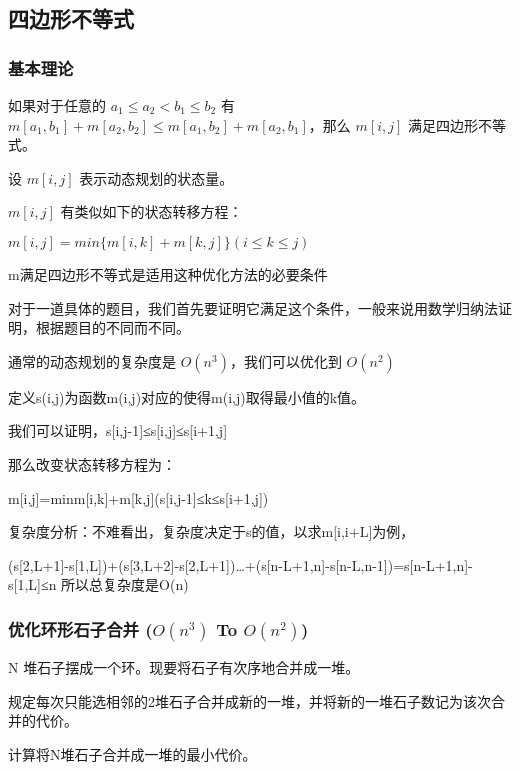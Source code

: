 \subsection{四边形不等式}

\subsubsection{基本理论}

如果对于任意的 $a_1 \le a_2 < b_1 \le b_2 $ 有 $m[a_1, b_1] + m[a_2, b_2] \le m[a_1, b_2] + m[a_2, b_1]$，那么 $m[i, j]$ 满足四边形不等式。

设 $m[i, j]$ 表示动态规划的状态量。

$m[i, j]$ 有类似如下的状态转移方程：

$m[i,j] = min\{m[i, k] + m[k, j]\} (i \le k \le j)$

m满足四边形不等式是适用这种优化方法的必要条件

对于一道具体的题目，我们首先要证明它满足这个条件，一般来说用数学归纳法证明，根据题目的不同而不同。

通常的动态规划的复杂度是 $O(n^3)$，我们可以优化到 $O(n^2)$

定义s(i,j)为函数m(i,j)对应的使得m(i,j)取得最小值的k值。

我们可以证明，s[i,j-1]≤s[i,j]≤s[i+1,j]

那么改变状态转移方程为：

m[i,j]=min{m[i,k]+m[k,j]}(s[i,j-1]≤k≤s[i+1,j])

复杂度分析：不难看出，复杂度决定于s的值，以求m[i,i+L]为例，

(s[2,L+1]-s[1,L])+(s[3,L+2]-s[2,L+1])…+(s[n-L+1,n]-s[n-L,n-1])=s[n-L+1,n]-s[1,L]≤n
所以总复杂度是O(n)

\subsubsection{优化环形石子合并  ($O(n^3)$ To $O(n^2)$)}

N 堆石子摆成一个环。现要将石子有次序地合并成一堆。

规定每次只能选相邻的2堆石子合并成新的一堆，并将新的一堆石子数记为该次合并的代价。

计算将N堆石子合并成一堆的最小代价。

